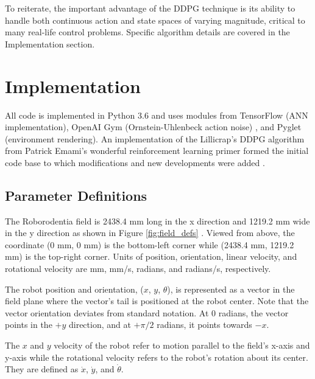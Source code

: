 To reiterate, the important advantage of the DDPG technique is its ability to handle both continuous action and state spaces of varying magnitude, critical to many real-life control problems. Specific algorithm details are covered in the Implementation section.

\section{Implementation}
All code is implemented in Python 3.6 and uses modules from TensorFlow \cite{tensorflow} (ANN implementation), OpenAI Gym (Ornstein-Uhlenbeck action noise) \cite{openaigym}, and Pyglet (environment rendering). An implementation of the Lillicrap's DDPG algorithm from Patrick Emami's wonderful reinforcement learning primer formed the initial code base to which modifications and new developments were added \cite{emami_2016}.


\subsection{Parameter Definitions}
The Roborodentia field is 2438.4 mm long in the x direction and 1219.2 mm wide in the y direction as shown in Figure \ref{fig:field_defs} \cite{roborodentia}. Viewed from above, the coordinate (0 mm, 0 mm) is the bottom-left corner while (2438.4 mm, 1219.2 mm) is the top-right corner. Units of position, orientation, linear velocity, and rotational velocity are mm, mm/s, radians, and radians/s, respectively.

The robot position and orientation, ($x$, $y$, $\theta$), is represented as a vector in the field plane where the vector's tail is positioned at the robot center. Note that the vector orientation deviates from standard notation. At 0 radians, the vector points in the $+y$ direction, and at $+\pi/2$ radians, it points towards $-x$. 

The $x$ and $y$ velocity of the robot refer to motion parallel to the field's x-axis and y-axis while the rotational velocity refers to the robot's rotation about its center. They are defined as $\dot{x}$, $\dot{y}$, and $\dot{\theta}$. 


